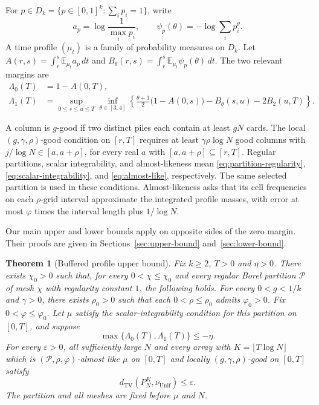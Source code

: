 \documentclass[11pt]{article}
\numberwithin{equation}{section}
\newtheorem{theorem}{Theorem}[section]
\theoremstyle{definition}
\theoremstyle{remark}
\newcommand{\E}{\mathbb E}
\newcommand{\TV}{\mathrm{TV}}
\newcommand{\Unif}{\mathrm{Unif}}
\newcommand{\dTV}{d_{\TV}}
\newcommand{\nuUnif}{\nu_{\Unif}}
\newcommand{\1}{\mathbf 1}
\begin{document}
For $p\in D_k=\{p\in[0,1]^k:\sum_i p_i=1\}$, write
\[
 a_p=\log\frac1{\max_i p_i},\qquad
 \psi_p(\theta)=-\log\sum_i p_i^\theta.
\]
A time profile $(\mu_t)$ is a family of probability measures on $D_k$.
Let $A(r,s)=\int_r^s\E_{\mu_t}a_p\,dt$ and
$B_\theta(r,s)=\int_r^s\E_{\mu_t}\psi_p(\theta)\,dt$.
The two relevant margins are
\begin{align*}
 \Lambda_0(T)&=1-A(0,T),\\
 \Lambda_1(T)&=\sup_{0\le s\le u\le T}\inf_{\theta\in[3,4]}
 \left\{\frac{\theta+3}{2}\bigl(1-A(0,s)\bigr)
       -B_\theta(s,u)-2B_2(u,T)\right\}.
\end{align*}

A column is $g$-good if two distinct piles each contain at least
$gN$ cards. The local $(g,\gamma,\rho)$-good condition on $[r,T]$
requires at least $\gamma\rho\log N$ good columns with
$j/\log N\in[a,a+\rho]$, for every real $a$ with
$[a,a+\rho]\subseteq[r,T]$.
Regular partitions, scalar integrability, and almost-likeness mean
\eqref{eq:partition-regularity}, \eqref{eq:scalar-integrability}, and
\eqref{eq:almost-like}, respectively. The same selected partition is
used in these conditions. Almost-likeness asks that its cell frequencies
on each $\rho$-grid interval approximate the integrated profile masses,
with error at most $\varphi$ times the interval length plus $1/\log N$.

Our main upper and lower bounds apply on opposite sides of the zero
margin. Their proofs are given in Sections~\ref{sec:upper-bound}
and~\ref{sec:lower-bound}.

\begin{theorem}[Buffered profile upper bound]%
\label{thm:upper-profile}
Fix $k\ge2$, $T>0$ and $\eta>0$. There exists $\chi_0>0$ such that,
for every $0<\chi\le\chi_0$ and every regular Borel partition $\mathcal P$ of
mesh $\chi$ with regularity constant $1$, the following holds.
For every $0<g<1/k$ and $\gamma>0$, there exists $\rho_0>0$ such
that each $0<\rho\le\rho_0$ admits $\varphi_0>0$. Fix
$0<\varphi\le\varphi_0$. Let $\mu$ satisfy the scalar-integrability
condition for this partition on $[0,T]$, and suppose
\[
 \max\{\Lambda_0(T),\Lambda_1(T)\}\le-\eta.
\]
For every $\varepsilon>0$, all sufficiently large $N$ and every array
with $K=\lfloor T\log N\rfloor$ which is
$(\mathcal P,\rho,\varphi)$-almost like $\mu$ on $[0,T]$ and locally
$(g,\gamma,\rho)$-good on $[0,T]$ satisfy
\[
 \dTV(P_N^K,\nuUnif)\le\varepsilon.
\]
The partition and all meshes are fixed before $\mu$ and $N$.
\end{theorem}
\end{document}
